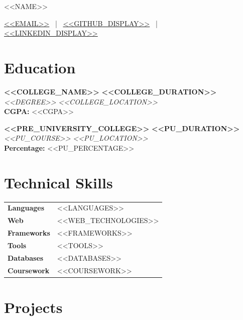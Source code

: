 \documentclass[11pt]{article}
\begin{document}
\centerline{\Huge <<NAME>>}

\vspace{5pt}

\centerline{
\href{mailto:<<EMAIL>>}{<<EMAIL>>} ~|~
\href{<<GITHUB_URL>>}{<<GITHUB_DISPLAY>>} ~|~
\href{<<LINKEDIN_URL>>}{<<LINKEDIN_DISPLAY>>}
}

\vspace{-10pt}

\section*{Education}

\textbf{<<COLLEGE_NAME>>} \hfill \textbf{<<COLLEGE_DURATION>>} \\
\textit{<<DEGREE>>} \hfill \textit{<<COLLEGE_LOCATION>>} \\
\textbf{CGPA:} <<CGPA>>

\vspace{4pt}

\textbf{<<PRE_UNIVERSITY_COLLEGE>>} \hfill \textbf{<<PU_DURATION>>} \\
\textit{<<PU_COURSE>>} \hfill \textit{<<PU_LOCATION>>} \\
\textbf{Percentage:} <<PU_PERCENTAGE>>

\section*{Technical Skills}

\begin{tabular}{ l l }
\textbf{Languages} & <<LANGUAGES>> \\
\textbf{Web} & <<WEB_TECHNOLOGIES>> \\
\textbf{Frameworks} & <<FRAMEWORKS>> \\
\textbf{Tools} & <<TOOLS>> \\
\textbf{Databases} & <<DATABASES>> \\
\textbf{Coursework} & <<COURSEWORK>> \\
\end{tabular}

\vspace{-6pt}

\section*{Projects}
\end{document}
